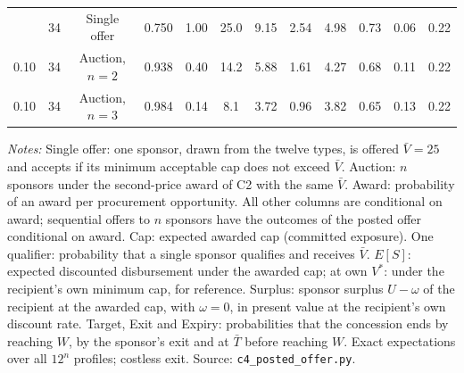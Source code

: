 \begin{table}[htbp]
{\begin{tabular}{cccccccccccc}
\addlinespace
0.10 & 34 & Single offer & 0.750 & 1.00 & 25.0 & 9.15 & 2.54 & 4.98 & 0.73 & 0.06 & 0.22\\
0.10 & 34 & Auction, $n = 2$ & 0.938 & 0.40 & 14.2 & 5.88 & 1.61 & 4.27 & 0.68 & 0.11 & 0.22\\
0.10 & 34 & Auction, $n = 3$ & 0.984 & 0.14 & 8.1 & 3.72 & 0.96 & 3.82 & 0.65 & 0.13 & 0.22\\
\bottomrule\end{tabular}}
\par\smallskip\begin{minipage}{\textwidth}\footnotesize\textit{Notes:} Single offer: one sponsor, drawn from the twelve types, is offered $\bar V = 25$ and accepts if its minimum acceptable cap does not exceed $\bar V$. Auction: $n$ sponsors under the second-price award of C2 with the same $\bar V$. Award: probability of an award per procurement opportunity. All other columns are conditional on award; sequential offers to $n$ sponsors have the outcomes of the posted offer conditional on award. Cap: expected awarded cap (committed exposure). One qualifier: probability that a single sponsor qualifies and receives $\bar V$. $E[S]$: expected discounted disbursement under the awarded cap; at own $V^*$: under the recipient's own minimum cap, for reference. Surplus: sponsor surplus $U - \omega$ of the recipient at the awarded cap, with $\omega = 0$, in present value at the recipient's own discount rate. Target, Exit and Expiry: probabilities that the concession ends by reaching $W$, by the sponsor's exit and at $\bar T$ before reaching $W$. Exact expectations over all $12^n$ profiles; costless exit. Source: \texttt{c4\_posted\_offer.py}.\end{minipage}
\end{table}

